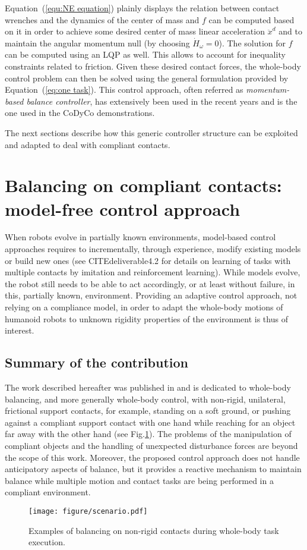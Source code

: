 \documentclass[12pt,a4paper,twoside]{article}
\begin{document}
Equation~(\ref{equ:NE equation}) plainly displays the relation between contact wrenches and the dynamics of the center of mass and $f$ can be computed based on it in order to achieve some desired center of mass linear acceleration $\ddot{x}^d$ and to maintain the angular momentum null (by choosing $\dot{H}_{\omega} = 0$). The solution for $f$ can be computed using an LQP as well. This allows to account for inequality constraints related to friction. Given these desired contact forces, the whole-body control problem can then be solved using the general formulation provided by Equation~(\ref{eq:one task}). This control approach, often referred as \textit{momentum-based balance controller}, has extensively been used in the recent years \cite{Lee&Goswami12,perrin_ISRR2015,Herzog2015} and is the one used in the CoDyCo demonstrations.

The next sections describe how this generic controller structure can be exploited and adapted to deal with compliant contacts.

\section{Balancing on compliant contacts: model-free control approach}

When robots evolve in partially known environments, model-based control approaches requires to incrementally, through experience, modify existing models or build new ones (see CITEdeliverable4.2 for details on learning of tasks with multiple contacts by imitation and reinforcement learning). While models evolve, the robot still needs to be able to act accordingly, or at least without failure, in this, partially known, environment. Providing an adaptive control approach, not relying on a compliance model, in order to adapt the whole-body motions of humanoid robots to unknown rigidity properties of the environment is thus of interest.

\subsection{Summary of the contribution}
The work described hereafter was published in \cite{liu_IROS2015} and is dedicated to whole-body balancing, and more generally whole-body control, with non-rigid, unilateral, frictional support contacts, for example, standing on a soft ground, or pushing against a compliant support contact with one hand while reaching for an object far away with the other hand (see Fig.\ref{reaching}). The problems of the manipulation of compliant objects and the handling of unexpected disturbance forces are beyond the scope of this work. Moreover, the proposed control approach does not handle anticipatory aspects of balance, but it provides a reactive  mechanism to maintain balance while multiple motion and contact tasks are being performed in a compliant environment.
\begin{figure}[!t]
\centering
\vspace{5pt}
\texttt{[image: figure/scenario.pdf]}
\caption{Examples of balancing on non-rigid contacts during whole-body task execution.}
\label{reaching}
\end{figure}
\end{document}
